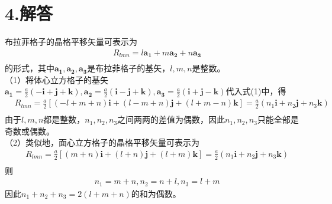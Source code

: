 \documentclass[UTF8]{ctexart}
\begin{document}
\section*{4.解答}
布拉菲格子的晶格平移矢量可表示为
\begin{equation}
    \begin{aligned}
        & R_{lmn}=l\bm{a_1}+m\bm{a_2}+n\bm{a_3}\\
    \end{aligned}
\end{equation}
的形式，其中$\bm{a_1},\bm{a_2},\bm{a_3}$是布拉菲格子的基矢，$l,m,n$是整数。\\
（1）将体心立方格子的基矢$\bm{a_1}=\frac{a}{2}(-\bm{i}+\bm{j}+\bm{k}),\bm{a_2}=\frac{a}{2}(\bm{i}-\bm{j}+\bm{k}),
\bm{a_3}=\frac{a}{2}(\bm{i}+\bm{j}-\bm{k})$代入式(1)中，得
\begin{equation*}
    \begin{aligned}
        & R_{lmn}=\frac{a}{2}[(-l+m+n)\bm{i}+(l-m+n)\bm{j}+(l+m-n)\bm{k}]=\frac{a}{2}(n_1\bm{i}+n_2\bm{j}+n_3\bm{k})\\
    \end{aligned}
\end{equation*}
由于$l,m,n$都是整数，$n_1,n_2,n_3$之间两两的差值为偶数，因此$n_1,n_2,n_3$只能全部是奇数或偶数。\\
（2）类似地，面心立方格子的晶格平移矢量可表示为
\begin{equation*}
    \begin{aligned}
        & R_{lmn}=\frac{a}{2}[(m+n)\bm{i}+(l+n)\bm{j}+(l+m)\bm{k}]=\frac{a}{2}(n_1\bm{i}+n_2\bm{j}+n_3\bm{k})\\
    \end{aligned}
\end{equation*}
则
\begin{equation*}
    \begin{aligned}
        & n_1=m+n,n_2=n+l,n_3=l+m
    \end{aligned}
\end{equation*}
因此$n_1+n_2+n_3=2(l+m+n)$的和为偶数。\\
\end{document}
